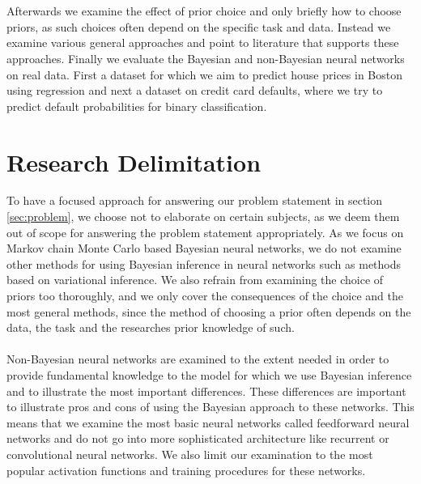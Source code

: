 \\
\\
Afterwards we examine the effect of prior choice and only briefly how to choose priors, as such choices often depend on the specific task and data. Instead we examine various general approaches and point to literature that supports these approaches. Finally we evaluate the Bayesian and non-Bayesian neural networks on real data. First a dataset for which we aim to predict house prices in Boston using regression and next a dataset on credit card defaults, where we try to predict default probabilities for binary classification. 


\section{Research Delimitation}
To have a focused approach for answering our problem statement in section \ref{sec:problem}, we choose not to elaborate on certain subjects, as we deem them out of scope for answering the problem statement appropriately. As we focus on Markov chain Monte Carlo based Bayesian neural networks, we do not examine other methods for using Bayesian inference in neural networks such as methods based on variational inference. We also refrain from examining the choice of priors too thoroughly, and we only cover the consequences of the choice and the most general methods, since the method of choosing a prior often depends on the data, the task and the researches prior knowledge of such. 
\\
\\
Non-Bayesian neural networks are examined to the extent needed in order to provide fundamental knowledge to the model for which we use Bayesian inference and to illustrate the most important differences. These differences are important to illustrate pros and cons of using the Bayesian approach to these networks. This means that we examine the most basic neural networks called feedforward neural networks and do not go into more sophisticated architecture like recurrent or convolutional neural networks. We also limit our examination to the most popular activation functions and training procedures for these networks. 
\\
\\







